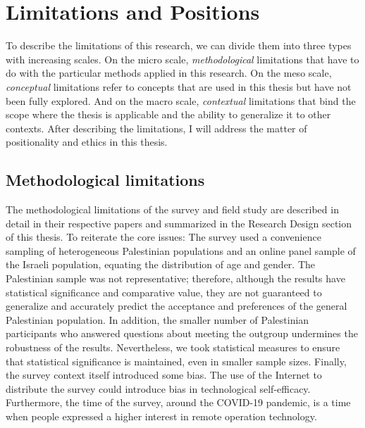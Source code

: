 \documentclass[dissertation,math,vertlayout,pdfa,colorlinks]{aaltoseries}
\begin{document}
\section{Limitations and Positions}
To describe the limitations of this research, we can divide them into three types with increasing scales. On the micro scale, \textit{methodological} limitations that have to do with the particular methods applied in this research. On the meso scale, \textit{conceptual} limitations refer to concepts that are used in this thesis but have not been fully explored. And on the macro scale, \textit{contextual} limitations that bind the scope where the thesis is applicable and the ability to generalize it to other contexts. After describing the limitations, I will address the matter of positionality and ethics in this thesis.

\subsection{Methodological limitations}
The methodological limitations of the survey and field study are described in detail in their respective papers and summarized in the Research Design section of this thesis. To reiterate the core issues: The survey used a convenience sampling of heterogeneous Palestinian populations and an online panel sample of the Israeli population, equating the distribution of age and gender. The Palestinian sample was not representative; therefore, although the results have statistical significance and comparative value, they are not guaranteed to generalize and accurately predict the acceptance and preferences of the general Palestinian population. In addition, the smaller number of Palestinian participants who answered questions about meeting the outgroup undermines the robustness of the results. Nevertheless, we took statistical measures to ensure that statistical significance is maintained, even in smaller sample sizes. Finally, the survey context itself introduced some bias. The use of the Internet to distribute the survey could introduce bias in technological self-efficacy. Furthermore, the time of the survey, around the COVID-19 pandemic, is a time when people expressed a higher interest in remote operation technology.
\end{document}
